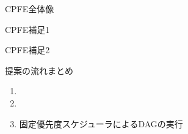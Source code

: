 
\begin{frame}[label=alg2]{CPFE全体像}
\end{frame}

\begin{frame}{CPFE補足1}
\end{frame}

\begin{frame}{CPFE補足2}
\end{frame}

\begin{frame}{提案の流れまとめ}
    \begin{enumerate}
        \item {}
        \item {}
        \item 固定優先度スケジューラによるDAGの実行
    \end{enumerate}
\end{frame}
